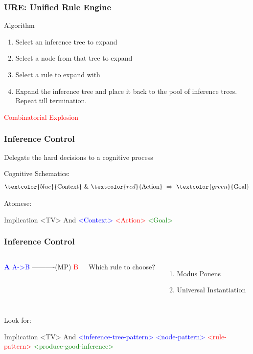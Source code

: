 \documentclass{beamer}
\begin{document}
\begin{frame}
  \frametitle{URE: Unified Rule Engine}

  Algorithm
  \begin{enumerate}
  \item \alert{Select an inference tree} to expand
  \item \alert{Select a node} from that tree to expand
  \item \alert{Select a rule} to expand with
  \item Expand the inference tree and place it back to the pool of
    inference trees. Repeat till termination.
  \end{enumerate}

  \begin{center}
    \textcolor{red}{Combinatorial Explosion}
  \end{center}
  
\end{frame}
  
\begin{frame}[fragile]
  \frametitle{Inference Control}

  \begin{center}
    Delegate the hard decisions to a \alert{cognitive process}
  \end{center}

  Cognitive Schematics:
  $$\textcolor{blue}{\text{Context}}\ \&\ \textcolor{red}{\text{Action}}\ \Rightarrow\ \textcolor{green}{\text{Goal}}$$

  {\small
Atomese:
\begin{semiverbatim}
Implication <TV>
  And
    \textcolor{blue}{<Context>}
    \textcolor{red}{<Action>}
  \textcolor{green}{<Goal>}
\end{semiverbatim}
}

\end{frame}

\begin{frame}[fragile]
  \frametitle{Inference Control}

  \begin{columns}
    \column{0.4in}
{\tiny \begin{semiverbatim}






\textcolor{blue}{{\bf A}  A->B}
----------(MP)      
   \textcolor{red}{B}




\end{semiverbatim}}
\column{2in}
Which rule to choose?
\begin{enumerate}
\item Modus Ponens
\item Universal Instantiation
\end{enumerate}
\end{columns}

Look for:
{\small
\begin{semiverbatim}
Implication <TV>
  And
    \textcolor{blue}{<inference-tree-pattern>
    <node-pattern>}
    \textcolor{red}{<rule-pattern>}
  \textcolor{green}{<produce-good-inference>}
\end{semiverbatim}
}

\end{frame}
\end{document}
